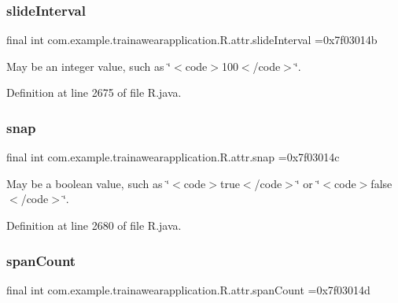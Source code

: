 \subsubsection{\texorpdfstring{slideInterval}{slideInterval}}
{\footnotesize\ttfamily final int com.\+example.\+trainawearapplication.\+R.\+attr.\+slide\+Interval =0x7f03014b\hspace{0.3cm}{\ttfamily [static]}}

May be an integer value, such as \char`\"{}$<$code$>$100$<$/code$>$\char`\"{}. 

Definition at line 2675 of file R.\+java.

\mbox{\label{classcom_1_1example_1_1trainawearapplication_1_1_r_1_1attr_ac3ef4c169c269dd4d331d004c58c674a}} 
\subsubsection{\texorpdfstring{snap}{snap}}
{\footnotesize\ttfamily final int com.\+example.\+trainawearapplication.\+R.\+attr.\+snap =0x7f03014c\hspace{0.3cm}{\ttfamily [static]}}

May be a boolean value, such as \char`\"{}$<$code$>$true$<$/code$>$\char`\"{} or \char`\"{}$<$code$>$false$<$/code$>$\char`\"{}. 

Definition at line 2680 of file R.\+java.

\mbox{\label{classcom_1_1example_1_1trainawearapplication_1_1_r_1_1attr_a37e1a7fcc328c15e7c8d4e3fc54b26ed}} 
\subsubsection{\texorpdfstring{spanCount}{spanCount}}
{\footnotesize\ttfamily final int com.\+example.\+trainawearapplication.\+R.\+attr.\+span\+Count =0x7f03014d\hspace{0.3cm}{\ttfamily [static]}}

